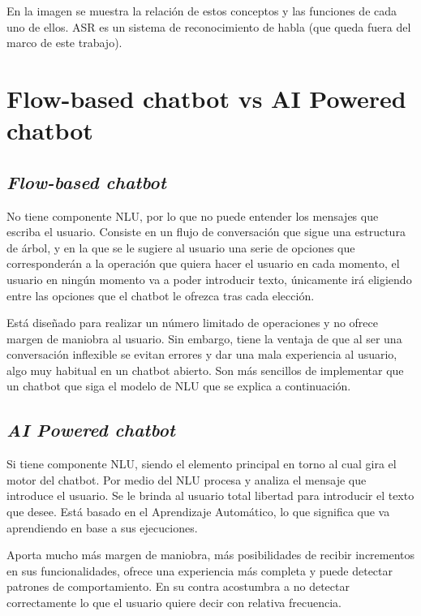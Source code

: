 
En la imagen se muestra la relación de estos conceptos y las funciones de cada uno de ellos.
ASR es un sistema de reconocimiento de habla (que queda fuera del marco de este trabajo).

\newpage

\section{Flow-based chatbot vs AI Powered chatbot}

\subsection{\textit{Flow-based chatbot}}
No tiene componente NLU, por lo que no puede entender los mensajes que escriba el usuario. Consiste en un flujo de conversación que sigue una estructura de árbol, y en la que se le sugiere al usuario una serie de opciones que corresponderán a la operación que quiera hacer el usuario en cada momento, el usuario en ningún momento va a poder introducir texto, únicamente irá eligiendo entre las opciones que el chatbot le ofrezca tras cada elección.

Está diseñado para realizar un número limitado de operaciones y no ofrece margen de maniobra al usuario. Sin embargo, tiene la ventaja de que al ser una conversación inflexible se evitan errores y dar una mala experiencia al usuario, algo muy habitual en un chatbot abierto. Son más sencillos de implementar que un chatbot que siga el modelo de NLU que se explica a continuación.

\subsection{\textit{AI Powered chatbot}}
Si tiene componente NLU, siendo el elemento principal en torno al cual gira el motor del chatbot. Por medio del NLU procesa y analiza el mensaje que introduce el usuario. Se le brinda al usuario total libertad para introducir el texto que desee. Está basado en el Aprendizaje Automático, lo que significa que va aprendiendo en base a sus ejecuciones.

Aporta mucho más margen de maniobra, más posibilidades de recibir incrementos en sus funcionalidades, ofrece una experiencia más completa y puede detectar patrones de comportamiento. En su contra acostumbra a no detectar correctamente lo que el usuario quiere decir con relativa frecuencia.

